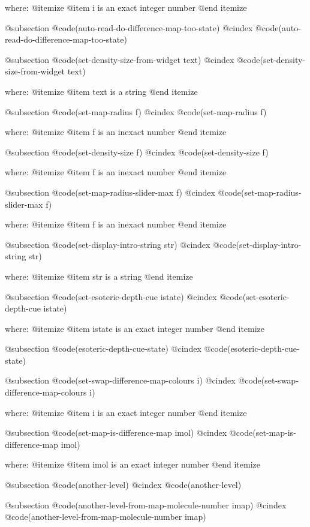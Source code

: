 where: 
 @itemize 
     @item i is an exact integer number
 @end itemize


@subsection @code{(auto-read-do-difference-map-too-state)}
@cindex @code{(auto-read-do-difference-map-too-state)}
 
@subsection @code{(set-density-size-from-widget text)}
@cindex @code{(set-density-size-from-widget text)}
 
where: 
 @itemize 
     @item text is a string
 @end itemize


@subsection @code{(set-map-radius f)}
@cindex @code{(set-map-radius f)}
 
where: 
 @itemize 
     @item f is an inexact number
 @end itemize


@subsection @code{(set-density-size f)}
@cindex @code{(set-density-size f)}
 
where: 
 @itemize 
     @item f is an inexact number
 @end itemize


@subsection @code{(set-map-radius-slider-max f)}
@cindex @code{(set-map-radius-slider-max f)}
 
where: 
 @itemize 
     @item f is an inexact number
 @end itemize


@subsection @code{(set-display-intro-string str)}
@cindex @code{(set-display-intro-string str)}
 
where: 
 @itemize 
     @item str is a string
 @end itemize


@subsection @code{(set-esoteric-depth-cue istate)}
@cindex @code{(set-esoteric-depth-cue istate)}
 
where: 
 @itemize 
     @item istate is an exact integer number
 @end itemize


@subsection @code{(esoteric-depth-cue-state)}
@cindex @code{(esoteric-depth-cue-state)}
 
@subsection @code{(set-swap-difference-map-colours i)}
@cindex @code{(set-swap-difference-map-colours i)}
 
where: 
 @itemize 
     @item i is an exact integer number
 @end itemize


@subsection @code{(set-map-is-difference-map imol)}
@cindex @code{(set-map-is-difference-map imol)}
 
where: 
 @itemize 
     @item imol is an exact integer number
 @end itemize


@subsection @code{(another-level)}
@cindex @code{(another-level)}
 
@subsection @code{(another-level-from-map-molecule-number imap)}
@cindex @code{(another-level-from-map-molecule-number imap)}
 
